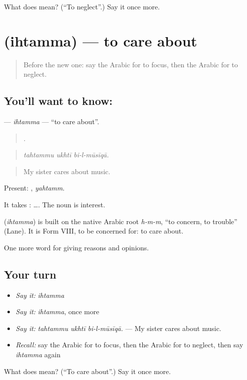\begin{tcolorbox}[breakable,colback=teal!4,colframe=teal!35!black,title={Before you move on}]
What does  mean? (\textquotedblleft{}To neglect\textquotedblright{}.) Say it once more.
\end{tcolorbox}
\section[\texorpdfstring{\ar{اهتم} (ihtamma)}{اهتم (ihtamma)}]{ (ihtamma) — to care about}

\label{lesson:AR-C368-ihtamma}



\begin{quote}
Before the new one: say the Arabic for to focus, then the Arabic for to neglect.
\end{quote}

\subsection*{You'll want to know: }
\textbf{} — \emph{ihtamma} — \textquotedblleft{}to care about\textquotedblright{}.

\begin{quote}
  .
\end{quote}

\begin{quote}
\emph{tahtammu ukhtī bi-l-mūsīqā.}
\end{quote}

\begin{quote}
My sister cares about music.
\end{quote}

Present: , \emph{yahtamm}.

It takes :   …. The noun  is interest.

\begin{cousinweb}
\textbf{} (\emph{ihtamma}) is built on the native Arabic root \emph{h-m-m}, \textquotedblleft{}to concern, to trouble\textquotedblright{} (Lane). It is Form VIII, to be concerned for: to care about.
\end{cousinweb}

\begin{grammarlens}[title={What you've built}]
One more word for giving reasons and opinions.
\end{grammarlens}

\subsection*{Your turn}
\begin{itemize}
\raggedright
  \item \emph{Say it:} \emph{ihtamma}
  \item \emph{Say it:} \emph{ihtamma}, once more
  \item \emph{Say it:} \emph{tahtammu ukhtī bi-l-mūsīqā.} — My sister cares about music.
  \item \emph{Recall:} say the Arabic for to focus, then the Arabic for to neglect, then say \emph{ihtamma} again
\end{itemize}

\begin{tcolorbox}[breakable,colback=teal!4,colframe=teal!35!black,title={Before you move on}]
What does  mean? (\textquotedblleft{}To care about\textquotedblright{}.) Say it once more.
\end{tcolorbox}
